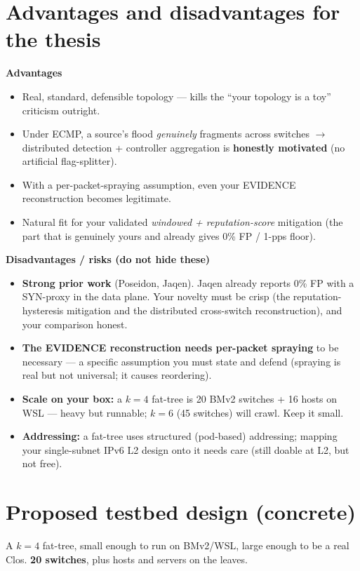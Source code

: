 \documentclass[11pt]{article}
\begin{document}
\section{Advantages and disadvantages for the thesis}
\textbf{Advantages}
\begin{itemize}[leftmargin=1.4em]
  \item Real, standard, defensible topology --- kills the ``your topology is a toy'' criticism outright.
  \item Under ECMP, a source's flood \emph{genuinely} fragments across switches $\to$ distributed
  detection + controller aggregation is \textbf{honestly motivated} (no artificial flag-splitter).
  \item With a per-packet-spraying assumption, even your EVIDENCE reconstruction becomes legitimate.
  \item Natural fit for your validated \emph{windowed + reputation-score} mitigation (the part that is
  genuinely yours and already gives 0\% FP / 1-pps floor).
\end{itemize}
\textbf{Disadvantages / risks (do not hide these)}
\begin{itemize}[leftmargin=1.4em]
  \item \textbf{Strong prior work} (Poseidon, Jaqen). Jaqen already reports 0\% FP with a SYN-proxy in the
  data plane. Your novelty must be crisp (the reputation-hysteresis mitigation and the distributed
  cross-switch reconstruction), and your comparison honest.
  \item \textbf{The EVIDENCE reconstruction needs per-packet spraying} to be necessary --- a specific
  assumption you must state and defend (spraying is real but not universal; it causes reordering).
  \item \textbf{Scale on your box:} a $k{=}4$ fat-tree is 20 BMv2 switches + 16 hosts on WSL --- heavy but
  runnable; $k{=}6$ (45 switches) will crawl. Keep it small.
  \item \textbf{Addressing:} a fat-tree uses structured (pod-based) addressing; mapping your single-subnet
  IPv6 L2 design onto it needs care (still doable at L2, but not free).
\end{itemize}

\section{Proposed testbed design (concrete)}
A $k{=}4$ fat-tree, small enough to run on BMv2/WSL, large enough to be a real Clos. \textbf{20 switches},
plus hosts and servers on the leaves.
\end{document}
